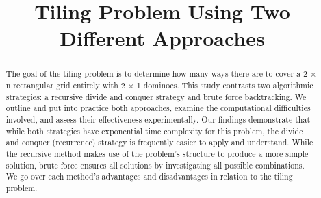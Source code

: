 \documentclass[conference]{IEEEtran}
\begin{document}
\title{Tiling Problem Using Two Different Approaches\\
}

\author{
\and
{}
\and
{}
\and
{}
\and
{}
\and
{}
}

\maketitle

\begin{abstract}
The goal of the tiling problem is to determine how many ways there are to cover a 2 × n rectangular grid entirely with 2 × 1 dominoes. This study contrasts two algorithmic strategies: a recursive divide and conquer strategy and brute force backtracking. We outline and put into practice both approaches, examine the computational difficulties involved, and assess their effectiveness experimentally. Our findings demonstrate that while both strategies have exponential time complexity for this problem, the divide and conquer (recurrence) strategy is frequently easier to apply and understand. While the recursive method makes use of the problem's structure to produce a more simple solution, brute force ensures all solutions by investigating all possible combinations. We go over each method's advantages and disadvantages in relation to the tiling problem.
\end{abstract}
\end{document}
